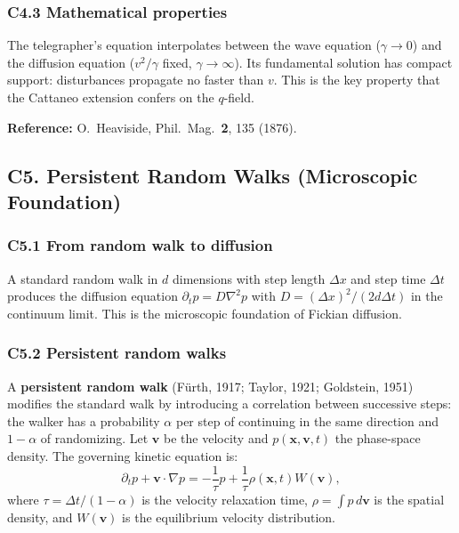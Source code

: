 \documentclass[reprint]{revtex4-2}
\begin{document}
\subsubsection{C4.3 Mathematical properties}

The telegrapher's equation interpolates between the wave equation ($\gamma\to 0$) and the diffusion equation ($v^2/\gamma$ fixed, $\gamma\to\infty$). Its fundamental solution has compact support: disturbances propagate no faster than $v$. This is the key property that the Cattaneo extension confers on the $q$-field.

\textbf{Reference:} O.\ Heaviside, Phil.\ Mag.\ \textbf{2}, 135 (1876).

\subsection{C5. Persistent Random Walks (Microscopic Foundation)}

\subsubsection{C5.1 From random walk to diffusion}

A standard random walk in $d$ dimensions with step length $\Delta x$ and step time $\Delta t$ produces the diffusion equation $\partial_t p = D\nabla^2 p$ with $D = (\Delta x)^2/(2d\Delta t)$ in the continuum limit. This is the microscopic foundation of Fickian diffusion.

\subsubsection{C5.2 Persistent random walks}

A \textbf{persistent random walk} (F\"urth, 1917; Taylor, 1921; Goldstein, 1951) modifies the standard walk by introducing a correlation between successive steps: the walker has a probability $\alpha$ per step of continuing in the same direction and $1-\alpha$ of randomizing. Let $\mathbf{v}$ be the velocity and $p(\mathbf{x},\mathbf{v},t)$ the phase-space density. The governing kinetic equation is:
\begin{equation}
\partial_t p + \mathbf{v}\cdot\nabla p = -\frac{1}{\tau}p + \frac{1}{\tau}\rho(\mathbf{x},t)W(\mathbf{v}),
\end{equation}
where $\tau = \Delta t/(1-\alpha)$ is the velocity relaxation time, $\rho = \int p\,d\mathbf{v}$ is the spatial density, and $W(\mathbf{v})$ is the equilibrium velocity distribution.
\end{document}

